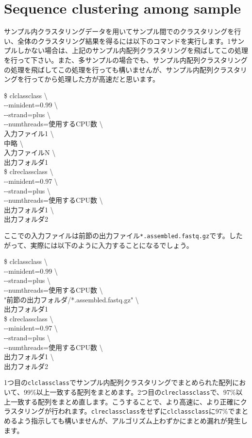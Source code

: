 \documentclass[titlepage,10pt,a4paper,english]{jsbook}
\newenvironment{cmd}{\begin{oframed}\raggedright\ttfamily\footnotesize\setlength{\baselineskip}{1.4em}}{\end{oframed}\vspace{-1em}}
\begin{document}
\section{Sequence clustering among sample}

サンプル内クラスタリングデータを用いてサンプル間でのクラスタリングを行い、全体のクラスタリング結果を得るには以下のコマンドを実行します。1サンプルしかない場合は、上記のサンプル内配列クラスタリングを飛ばしてこの処理を行って下さい。また、多サンプルの場合でも、サンプル内配列クラスタリングの処理を飛ばしてこの処理を行っても構いませんが、サンプル内配列クラスタリングを行ってから処理した方が高速だと思います。
\begin{cmd}
\$ clclassclass {\textbackslash}\\
{-}{-}minident=0.99 {\textbackslash}\\
{-}{-}strand=plus {\textbackslash}\\
{-}{-}numthreads=使用するCPU数 {\textbackslash}\\
入力ファイル1 {\textbackslash}\\
中略 {\textbackslash}\\
入力ファイルN {\textbackslash}\\
出力フォルダ1\\
\$ clreclassclass {\textbackslash}\\
{-}{-}minident=0.97 {\textbackslash}\\
{-}{-}strand=plus {\textbackslash}\\
{-}{-}numthreads=使用するCPU数 {\textbackslash}\\
出力フォルダ1 {\textbackslash}\\
出力フォルダ2
\end{cmd}
ここでの入力ファイルは前節の出力ファイル\texttt{*.assembled.fastq.gz}です。したがって、実際には以下のように入力することになるでしょう。
\begin{cmd}
\$ clclassclass {\textbackslash}\\
{-}{-}minident=0.99 {\textbackslash}\\
{-}{-}strand=plus {\textbackslash}\\
{-}{-}numthreads=使用するCPU数 {\textbackslash}\\
"前節の出力フォルダ/*.assembled.fastq.gz" {\textbackslash}\\
出力フォルダ1\\
\$ clreclassclass {\textbackslash}\\
{-}{-}minident=0.97 {\textbackslash}\\
{-}{-}strand=plus {\textbackslash}\\
{-}{-}numthreads=使用するCPU数 {\textbackslash}\\
出力フォルダ1 {\textbackslash}\\
出力フォルダ2
\end{cmd}
1つ目の\texttt{clclassclass}でサンプル内配列クラスタリングでまとめられた配列において、99\%以上一致する配列をまとめます。2つ目の\texttt{clreclassclass}で、97\%以上一致する配列をまとめ直します。こうすることで、より高速に、より正確にクラスタリングが行われます。\texttt{clreclassclass}をせずに\texttt{clclassclass}に97\%でまとめるよう指示しても構いませんが、アルゴリズム上わずかにまとめ漏れが発生します。
\end{document}
